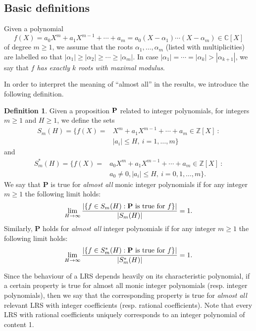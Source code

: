 \documentclass[12pt]{amsart}
\theoremstyle{definition}
\newtheorem{definition}[theorem]{Definition}
\theoremstyle{remark}
\numberwithin{equation}{section}
\begin{document}
\subsection{Basic definitions}
\label{sec:basic}

Given a polynomial
$$
f(X)=a_0X^m+a_1X^{m-1}+\cdots+a_m=a_0 (X-{\alpha}_1)\cdots (X-{\alpha}_m) \in {{\mathbb C}}[X]
$$
of degree $m\ge 1$, we assume that the roots ${\alpha}_1,\dots,{\alpha}_m$
(listed with multiplicities)
are labelled so that $|{\alpha}_1 | \ge |{\alpha}_2| \ge \cdots \ge |{\alpha}_m |$. In case $|{\alpha}_1|=\cdots =|{\alpha}_k |>|{\alpha}_{k+1} |$, we say that \textit{$f$ has exactly $k$ roots with maximal modulus}. 

In order to interpret the meaning of ``almost all'' in the results, we introduce the following definition.

\begin{definition}
Given a proposition ${{\bf P}}$ related to integer polynomials, for integers $m\ge 1$ and $H\ge 1$, we define the sets
\begin{equation*}
\begin{split}
S_m(H) =  \{f(X) = &X^m +a_1X^{m-1} + \cdots + a_m\in {{\mathbb Z}}[X]~:\\
&  |a_i| \le H, \ i =1, \ldots, m\}
\end{split}
\end{equation*}
and 
\begin{equation*}
\begin{split}
S_m^*(H) =  \{f(X) = &a_0X^m +a_1X^{m-1} + \cdots + a_m\in {{\mathbb Z}}[X]~:\\
&  a_0\ne 0, |a_i| \le H, \ i =0,1, \ldots, m\}.
\end{split}
\end{equation*}
We say that {\bf P} is true for \emph{almost all} monic integer polynomials
if for any integer $m\ge 1$ the following limit holds:
$$
\lim_{H\to \infty} \frac{|\{f\in S_m(H): \textrm{{\bf P} is true for $f$}\}|}{|S_m(H)|}=1.
$$
Similarly, {\bf P} holds for \emph{almost all} integer polynomials
if for any integer $m\ge 1$ the following limit holds:
$$
\lim_{H\to \infty} \frac{|\{f\in S_m^*(H): \textrm{{\bf P} is true for $f$}\}|}{|S_m^*(H)|}=1.
$$
\end{definition}

Since the behaviour of a LRS depends heavily on its characteristic polynomial, if a certain property is true for almost all monic integer polynomials (resp. integer polynomials), then we say that the corresponding property is true for \textit{almost all} relevant LRS with integer  coefficients (resp. rational coefficients). Note that every LRS with rational coefficients uniquely corresponds to an integer polynomial of content 1. 
\end{document}
